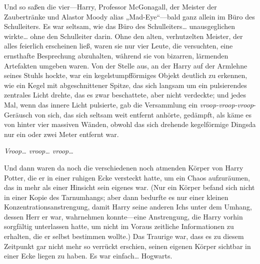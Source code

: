 Und so saßen die vier—Harry, Professor McGonagall, der Meister der Zaubertränke und Alastor Moody alias „Mad-Eye“—bald ganz allein im Büro des Schulleiters. Es war seltsam, wie das Büro des Schulleiters… unausgeglichen wirkte… ohne den Schulleiter darin. Ohne den alten, verhutzelten Meister, der alles feierlich erscheinen ließ, waren sie nur vier Leute, die versuchten, eine ernsthafte Besprechung abzuhalten, während sie von bizarren, lärmenden Artefakten umgeben waren. Von der Stelle aus, an der Harry auf der Armlehne seines Stuhls hockte, war ein kegelstumpfförmiges Objekt deutlich zu erkennen, wie ein Kegel mit abgeschnittener Spitze, das sich langsam um ein pulsierendes zentrales Licht drehte, das es zwar beschattete, aber nicht verdeckte; und jedes Mal, wenn das innere Licht pulsierte, gab die Versammlung ein \emph{vroop-vroop-vroop}-Geräusch von sich, das sich seltsam weit entfernt anhörte, gedämpft, als käme es von hinter vier massiven Wänden, obwohl das sich drehende kegelförmige Dingsda nur ein oder zwei Meter entfernt war.

\emph{Vroop… vroop… vroop…}

Und dann waren da noch die verschiedenen noch atmenden Körper von Harry Potter, die er in einer ruhigen Ecke versteckt hatte, um ein Chaos aufzuräumen, das in mehr als einer Hinsicht sein eigenes war. (Nur ein Körper befand sich nicht in einer Kopie des Tarnumhangs; aber dann bedurfte es nur einer kleinen Konzentrationsanstrengung, damit Harry seine anderen Ichs unter dem Umhang, dessen Herr er war, wahrnehmen konnte—eine Anstrengung, die Harry vorhin sorgfältig unterlassen hatte, um nicht im Voraus zeitliche Informationen zu erhalten, die er selbst bestimmen wollte.) Das Traurige war, dass es zu diesem Zeitpunkt gar nicht mehr so verrückt erschien, seinen eigenen Körper sichtbar in einer Ecke liegen zu haben. Es war einfach… Hogwarts.

